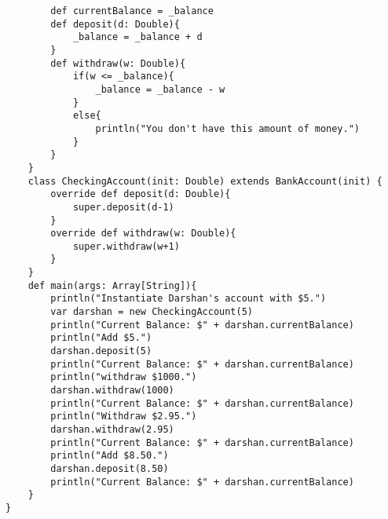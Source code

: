 \documentclass[11pt]{article}
\begin{document}
\begin{enumerate}
\begin{enumerate}
\begin{lstlisting}
		def currentBalance = _balance
		def deposit(d: Double){
			_balance = _balance + d
		}
		def withdraw(w: Double){
			if(w <= _balance){
				_balance = _balance - w
			}
			else{
				println("You don't have this amount of money.")
			}
		}
	}
	class CheckingAccount(init: Double) extends BankAccount(init) {
		override def deposit(d: Double){
			super.deposit(d-1)
		}
		override def withdraw(w: Double){
			super.withdraw(w+1)
		}
	}
	def main(args: Array[String]){
		println("Instantiate Darshan's account with $5.")
		var darshan = new CheckingAccount(5)
		println("Current Balance: $" + darshan.currentBalance)
		println("Add $5.")
		darshan.deposit(5)
		println("Current Balance: $" + darshan.currentBalance)
		println("withdraw $1000.")
		darshan.withdraw(1000)
		println("Current Balance: $" + darshan.currentBalance)
		println("Withdraw $2.95.")
		darshan.withdraw(2.95)
		println("Current Balance: $" + darshan.currentBalance)
		println("Add $8.50.")
		darshan.deposit(8.50)
		println("Current Balance: $" + darshan.currentBalance)
	}
}
\end{lstlisting}

\end{enumerate}

\end{enumerate} 
\end{document}
